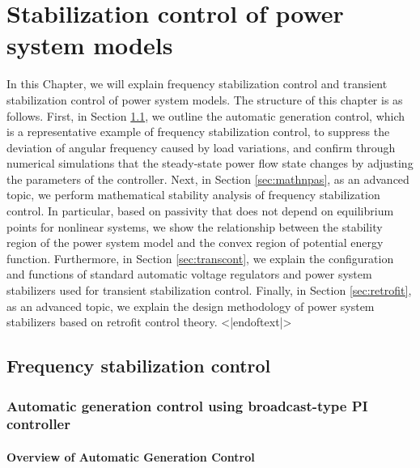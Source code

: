 \documentclass[graybox, envcountchap]{svmult}
\begin{document}
\chapter{Stabilization control of power system models}\label{ch:stabcont}
In this Chapter, we will explain frequency stabilization control and transient
stabilization control of power system models. The structure of this chapter is
as follows. First, in Section \ref{sec:agcover}, we outline the automatic
generation control, which is a representative example of frequency stabilization
control, to suppress the deviation of angular frequency caused by load
variations, and confirm through numerical simulations that the steady-state
power flow state changes by adjusting the parameters of the controller. Next, in
Section \ref{sec:mathnpas}, as an advanced topic, we perform mathematical
stability analysis of frequency stabilization control. In particular, based on
passivity that does not depend on equilibrium points for nonlinear systems, we
show the relationship between the stability region of the power system model and
the convex region of potential energy function. Furthermore, in Section
\ref{sec:transcont}, we explain the configuration and functions of standard
automatic voltage regulators and power system stabilizers used for transient
stabilization control. Finally, in Section \ref{sec:retrofit}, as an advanced
topic, we explain the design methodology of power system stabilizers based on
retrofit control theory. <|endoftext|>

\section{Frequency stabilization control}\label{sec:agcover}
\subsection{Automatic generation control using broadcast-type PI controller}\label{sec:broadPI}

\smallskip
\subsubsection{Overview of Automatic Generation Control}
\end{document}
